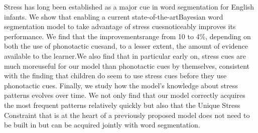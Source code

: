 Stress has long been established as a major cue in word segmentation for English infants. We show that enabling a current state-of-the-artBayesian word segmentation model to take advantage of stress cuesnoticeably improves its performance. We find that the improvementsrange from 10 to 4\%, depending on both the use of phonotactic cuesand, to a lesser extent, the amount of evidence available to the learner.We also find that in particular early on, stress cues are much moreuseful for our model than phonotactic cues by themselves, consistent with the finding that children do seem to use stress cues before they use phonotactic cues. Finally, we study how the model's knowledge about stress patterns evolves over time. We not only find that our model correctly acquires the most frequent patterns relatively quickly but also that the Unique Stress Constraint that is at the heart of a previously proposed model does not need to be built in but can be acquired jointly with word segmentation.
